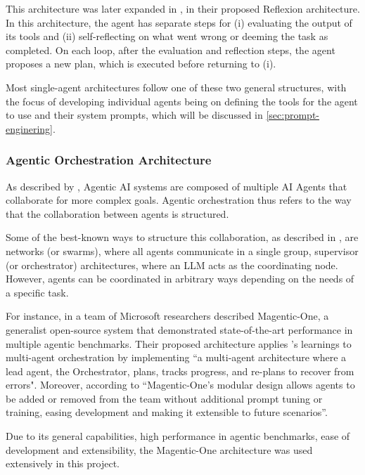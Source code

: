 \documentclass[a4paper]{report}
\begin{document}
This architecture was later expanded in \cite{shinn2023reflexion}, in their proposed Reflexion architecture. In this architecture, the agent has separate steps for (i) evaluating the output of its tools and (ii) self-reflecting on what went wrong or deeming the task as completed. On each loop, after the evaluation and reflection steps, the agent proposes a new plan, which is executed before returning to (i).

Most single-agent architectures follow one of these two general structures, with the focus of developing individual agents being on defining the tools for the agent to use and their system prompts, which will be discussed in \autoref{sec:prompt-enginering}.

\subsubsection{Agentic Orchestration Architecture}

As described by \cite{sapkota2025aiagentsvsagentic}, Agentic AI systems are composed of multiple AI Agents that collaborate for more complex goals. Agentic orchestration thus refers to the way that the collaboration between agents is structured.

Some of the best-known ways to structure this collaboration, as described in \cite{langgraphagmultiagentsystems}, are networks (or swarms), where all agents communicate in a single group, supervisor (or orchestrator) architectures, where an LLM acts as the coordinating node. However, agents can be coordinated in arbitrary ways depending on the needs of a specific task.

For instance, in \cite{fourney2024magenticone} a team of Microsoft researchers described Magentic-One, a generalist open-source system that demonstrated state-of-the-art performance in multiple agentic benchmarks. Their proposed architecture applies \cite{shinn2023reflexion}'s learnings to multi-agent orchestration by implementing ``a multi-agent architecture where a lead agent, the Orchestrator, plans, tracks progress, and re-plans to recover from errors". Moreover, according to \cite{fourney2024magenticone} ``Magentic-One's modular design allows agents to be added or removed from the team without additional prompt tuning or training, easing development and making it extensible to future scenarios''.

Due to its general capabilities, high performance in agentic benchmarks, ease of development and extensibility, the Magentic-One architecture was used extensively in this project.
\end{document}

